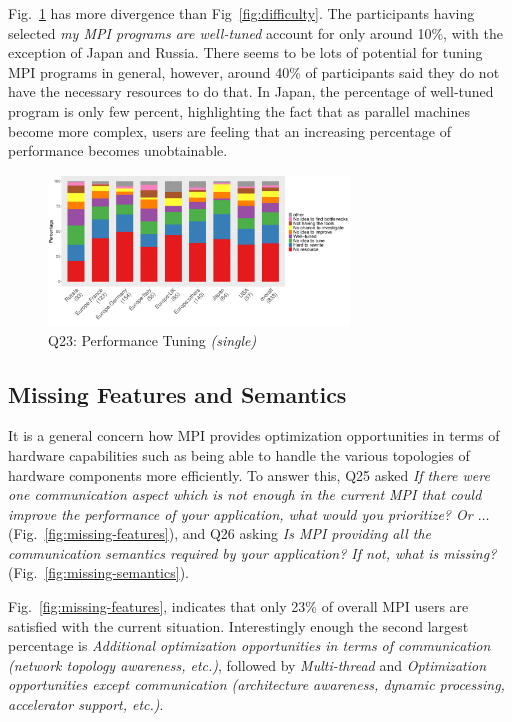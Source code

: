 \documentclass[preprint,5p,times]{elsarticle}
\def\myquote#1{{\it #1}}
\newcommand{\revision}[2]{{\color{blue}#2}}
\def\countries{contributors\xspace{}}%
\begin{document}
Fig.~\ref{fig:tuning} has more divergence than Fig~\ref{fig:difficulty}. The
participants having selected \myquote{my MPI programs are well-tuned} account
for only around 10\%, with the exception of Japan and Russia. There seems to be
\revision{a lots of room to tune}{lots of potential for tuning} MPI programs in general, however, around 40\% of
participants said they do not have the necessary resources to do that. In Japan,
the percentage of well-tuned program is only few percent, highlighting the fact
that as parallel machines become more complex, users are feeling that an
increasing percentage of performance \revision{become}{becomes} unobtainable.

\begin{figure}[tb]
\begin{center}
\includegraphics[width=8.0cm]{R-scripts/Q23.pdf}
\vspace{-2mm}
\caption{Q23: Performance Tuning {\it(single)}}
\label{fig:tuning}
\end{center}
\end{figure}

\subsection{Missing Features and Semantics}

It is a general concern how MPI provides optimization
opportunities in terms of hardware capabilities such as being able to
handle the various topologies of hardware components more
efficiently. To answer this, Q25 asked \myquote{If there were one
communication aspect which is not enough in the current MPI that could
improve the performance of your application, what would you
prioritize? Or $\ldots$} (Fig.~\ref{fig:missing-features}), and Q26 asking
\myquote{Is MPI providing all the communication semantics required by your
application? If not, what is missing?}
(Fig.~\ref{fig:missing-semantics}).

Fig.~\ref{fig:missing-features}, indicates that only 23\% of overall MPI users
are satisfied with the current situation. Interestingly enough the second
largest percentage is \myquote{Additional optimization opportunities in terms of
communication (network topology awareness, etc.)}, followed by
\myquote{Multi-thread} and \myquote{Optimization opportunities except
communication (architecture awareness, dynamic processing, accelerator support,
etc.)}.
\end{document}
